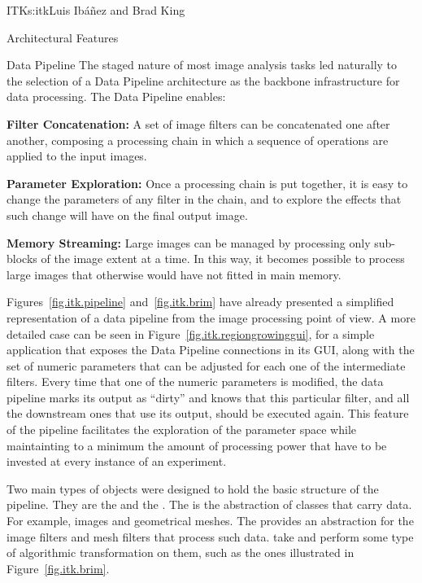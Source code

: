 \begin{aosachapter}{ITK}{s:itk}{Luis Ib\'{a}\~{n}ez and Brad King}
\begin{aosasect1}{Architectural Features}
\begin{aosasect2}{Data Pipeline}
The staged nature of most image analysis tasks led naturally to the selection
of a Data Pipeline architecture as the backbone infrastructure for data
processing. The Data Pipeline enables:

\begin{aosaitemize}

\item \textbf{Filter Concatenation:} A set of image filters can be concatenated
one after another, composing a processing chain in which a sequence of
operations are applied to the input images.

\item \textbf{Parameter Exploration:} Once a processing chain is put together,
it is easy to change the parameters of any filter in the chain, and to explore
the effects that such change will have on the final output image.

\item \textbf{Memory Streaming:} Large images can be managed by processing only
sub-blocks of the image extent at a time. In this way, it becomes possible to
process large images that otherwise would have not fitted in main memory.

\end{aosaitemize}


Figures~\ref{fig.itk.pipeline} and~\ref{fig.itk.brim} have already presented a
simplified representation of a data pipeline from the image processing point of
view. A more detailed case can be seen in
Figure~\ref{fig.itk.regiongrowinggui}, for a simple application that exposes
the Data Pipeline connections in its GUI, along with the set of numeric
parameters that can be adjusted for each one of the intermediate filters. Every
time that one of the numeric parameters is modified, the data pipeline marks
its output as ``dirty'' and knows that this particular filter, and all the
downstream ones that use its output, should be executed again. This feature of
the pipeline facilitates the exploration of the parameter space while
maintainting to a minimum the amount of processing power that have to be
invested at every instance of an experiment.

Two main types of objects were designed to hold the basic structure of the
pipeline.  They are the  and the . The
 is the abstraction of classes that carry data. For example,
images and geometrical meshes. The  provides an abstraction
for the image filters and mesh filters that process such data.
 take  and perform some type of
algorithmic transformation on them, such as the ones illustrated
in Figure~\ref{fig.itk.brim}.


\end{aosasect2}
\end{aosasect1}
\end{aosachapter}
